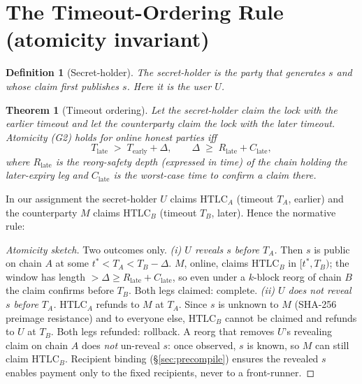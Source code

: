 \documentclass[11pt]{article}
\newtheorem{theorem}{Theorem}
\newtheorem{definition}{Definition}
\begin{document}
\section{The Timeout-Ordering Rule (atomicity invariant)}
\label{sec:to}

\begin{definition}[Secret-holder]
The secret-holder is the party that generates $s$ and whose claim first
publishes $s$. Here it is the user $U$.
\end{definition}

\begin{theorem}[Timeout ordering]
\label{thm:to}
Let the secret-holder claim the lock with the \emph{earlier} timeout and let the
counterparty claim the lock with the \emph{later} timeout. Atomicity (G2) holds
for online honest parties iff
\[
  T_{\text{late}} \;>\; T_{\text{early}} + \Delta,
  \qquad
  \Delta \;\ge\; R_{\text{late}} + C_{\text{late}},
\]
where $R_{\text{late}}$ is the reorg-safety depth (expressed in time) of the
chain holding the later-expiry leg and $C_{\text{late}}$ is the worst-case time
to confirm a claim there.
\end{theorem}

In our assignment the secret-holder $U$ claims $\mathrm{HTLC}_A$ (timeout $T_A$,
earlier) and the counterparty $M$ claims $\mathrm{HTLC}_B$ (timeout $T_B$,
later). Hence the normative rule:
\begin{center}
\end{center}

\begin{proof}[Atomicity sketch]
Two outcomes only.
\emph{(i) $U$ reveals $s$ before $T_A$.} Then $s$ is public on chain $A$ at some
$t^\ast < T_A < T_B-\Delta$. $M$, online, claims $\mathrm{HTLC}_B$ in
$[t^\ast, T_B)$; the window has length $> \Delta \ge R_{\text{late}} +
C_{\text{late}}$, so even under a $k$-block reorg of chain $B$ the claim
confirms before $T_B$. Both legs claimed: complete.
\emph{(ii) $U$ does not reveal $s$ before $T_A$.} $\mathrm{HTLC}_A$ refunds to
$M$ at $T_A$. Since $s$ is unknown to $M$ (SHA-256 preimage resistance) and to
everyone else, $\mathrm{HTLC}_B$ cannot be claimed and refunds to $U$ at $T_B$.
Both legs refunded: rollback.
A reorg that removes $U$'s revealing claim on chain $A$ does \emph{not}
un-reveal $s$: once observed, $s$ is known, so $M$ can still claim
$\mathrm{HTLC}_B$. Recipient binding (\S\ref{sec:precompile}) ensures the
revealed $s$ enables payment only to the fixed recipients, never to a
front-runner.
\end{proof}
\end{document}
